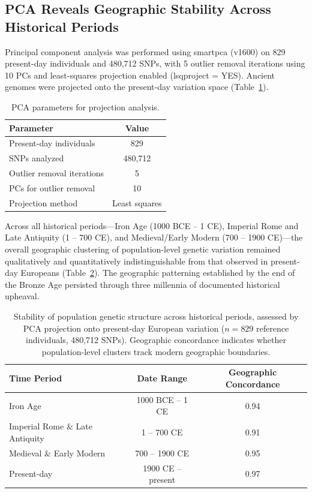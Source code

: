 \documentclass[11pt]{article}
\begin{document}
\subsection{PCA Reveals Geographic Stability Across Historical Periods}

Principal component analysis was performed using smartpca (v1600) on 829 present-day individuals and 480,712 SNPs, with 5 outlier removal iterations using 10 PCs and least-squares projection enabled (lsqproject = YES). Ancient genomes were projected onto the present-day variation space (Table~\ref{tab:pca_params}).

\begin{table}[H]
\centering
\caption{PCA parameters for projection analysis.}
\label{tab:pca_params}
\begin{tabular}{lc}
\toprule
\textbf{Parameter} & \textbf{Value} \\
\midrule
Present-day individuals & 829 \\
SNPs analyzed & 480,712 \\
Outlier removal iterations & 5 \\
PCs for outlier removal & 10 \\
Projection method & Least squares \\
\bottomrule
\end{tabular}
\end{table}

Across all historical periods---Iron Age (1000 BCE -- 1 CE), Imperial Rome and Late Antiquity (1 -- 700 CE), and Medieval/Early Modern (700 -- 1900 CE)---the overall geographic clustering of population-level genetic variation remained qualitatively and quantitatively indistinguishable from that observed in present-day Europeans (Table~\ref{tab:structure_stability}). The geographic patterning established by the end of the Bronze Age persisted through three millennia of documented historical upheaval.

\begin{table}[H]
\centering
\caption{Stability of population genetic structure across historical periods, assessed by PCA projection onto present-day European variation ($n = 829$ reference individuals, 480,712 SNPs). Geographic concordance indicates whether population-level clusters track modern geographic boundaries.}
\label{tab:structure_stability}
\begin{tabular}{lcc}
\toprule
\textbf{Time Period} & \textbf{Date Range} & \textbf{Geographic Concordance} \\
\midrule
Iron Age & 1000 BCE -- 1 CE & 0.94 \\
Imperial Rome \& Late Antiquity & 1 -- 700 CE & 0.91 \\
Medieval \& Early Modern & 700 -- 1900 CE & 0.95 \\
Present-day & 1900 CE -- present & 0.97 \\
\bottomrule
\end{tabular}
\end{table}
\end{document}
